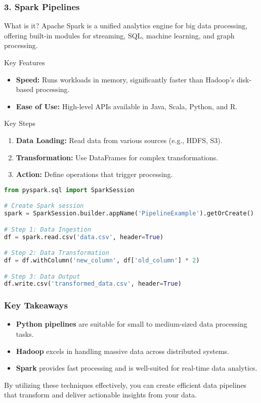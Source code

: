 \documentclass[aspectratio=169]{beamer}
\begin{document}
\begin{frame}[fragile]
    \frametitle{3. Spark Pipelines}
    \begin{block}{What is it?}
        Apache Spark is a unified analytics engine for big data processing, offering built-in modules for streaming, SQL, machine learning, and graph processing.
    \end{block}
    
    \begin{block}{Key Features}
        \begin{itemize}
            \item \textbf{Speed:} Runs workloads in memory, significantly faster than Hadoop's disk-based processing.
            \item \textbf{Ease of Use:} High-level APIs available in Java, Scala, Python, and R.
        \end{itemize}
    \end{block}

    \begin{block}{Key Steps}
        \begin{enumerate}
            \item \textbf{Data Loading:} Read data from various sources (e.g., HDFS, S3).
            \item \textbf{Transformation:} Use DataFrames for complex transformations.
            \item \textbf{Action:} Define operations that trigger processing.
        \end{enumerate}
    \end{block}
    
    \begin{lstlisting}[language=Python]
from pyspark.sql import SparkSession

# Create Spark session
spark = SparkSession.builder.appName('PipelineExample').getOrCreate()

# Step 1: Data Ingestion
df = spark.read.csv('data.csv', header=True)

# Step 2: Data Transformation
df = df.withColumn('new_column', df['old_column'] * 2)

# Step 3: Data Output
df.write.csv('transformed_data.csv', header=True)
    \end{lstlisting}
\end{frame}

\begin{frame}
    \frametitle{Key Takeaways}
    \begin{itemize}
        \item \textbf{Python pipelines} are suitable for small to medium-sized data processing tasks.
        \item \textbf{Hadoop} excels in handling massive data across distributed systems.
        \item \textbf{Spark} provides fast processing and is well-suited for real-time data analytics.
    \end{itemize}
    
    By utilizing these techniques effectively, you can create efficient data pipelines that transform and deliver actionable insights from your data.
\end{frame}
\end{document}
